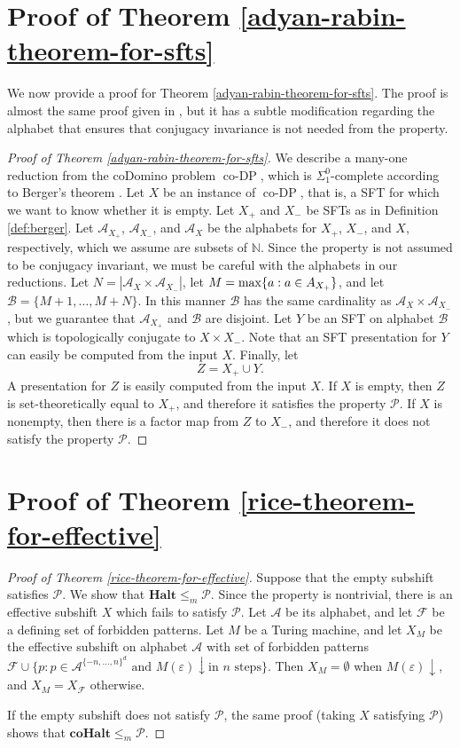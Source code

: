 \documentclass[a4paper]{article}
\newcommand{\coDP}{\operatorname{co-DP}}
\newcommand{\N}{\mathbb{N}}
\newcommand{\A}{\mathcal{A}}
\newcommand{\B}{\mathcal{B}}
\theoremstyle{definition}
\begin{document}
\newpage\appendix
\section{Proof of Theorem \ref{adyan-rabin-theorem-for-sfts}}\label{appendix-rice-theorems}
We now provide a proof for Theorem \ref{adyan-rabin-theorem-for-sfts}. The proof is almost the same proof given in \cite{carrasco-vargas_rice_2025}, but it has a subtle modification regarding the alphabet that ensures that  conjugacy invariance is not needed from the property.
\begin{proof}[Proof of Theorem \ref{adyan-rabin-theorem-for-sfts}]
    We describe a many-one reduction from the coDomino problem $\coDP$, which is $\Sigma_1^0$-complete according to Berger's theorem \cite{berger_undecidability_1966}. Let $X$ be an instance of $\coDP$, that is, a SFT for which we want to know whether it is empty. Let $X_{+}$ and $X_{-}$ be SFTs as in Definition \ref{def:berger}. Let $\A_{X_{+}}$, $\A_{X_{-}}$, and $\A_{X}$ be the alphabets for $X_{+}$, $X_{-}$, and $X$, respectively, which we assume are subsets of $\N$. Since the property is not assumed to be conjugacy invariant, we must be careful with the alphabets in our reductions. Let $N=|\A_{X}\times \A_{X_{-}}|$, let $M=\max\{a : a \in \mathcal \A_{X_{+}}\}$, and let $\B=\{M+1,\dots,M+N\}$. In this manner $\B$ has the same cardinality as $\A_{X}\times \A_{X_{-}}$, but we guarantee that $\A_{X_{+}}$ and $\B$ are disjoint. Let $Y$ be an SFT on alphabet $\B$ which is topologically conjugate to $X\times X_{-}$. Note that an SFT presentation for $Y$ can easily be computed from the input $X$. Finally, let 
    \[Z=X_{+}\cup Y.\]
    A presentation for $Z$ is easily computed from the input $X$. If $X$ is empty, then $Z$ is set-theoretically equal to $X_{+}$, and therefore it satisfies the property $\mathcal P$. If $X$ is nonempty, then there is a factor map from $Z$  to $X_{-}$, and therefore it does not satisfy the property $\mathcal P$. 
\end{proof}

\section{Proof of Theorem \ref{rice-theorem-for-effective}}
\label{appendix-rice-theorem-for-effective}
\begin{proof}[Proof of Theorem \ref{rice-theorem-for-effective}]
    Suppose that the empty subshift satisfies $\mathcal P$. We show that $\textbf{Halt}\leq_m \mathcal P$. Since the property is nontrivial, there is an effective subshift $X$ which fails to satisfy $\mathcal P$. Let $\A$ be its alphabet, and let $\mathcal F$ be a defining set of forbidden patterns. Let $M$ be a Turing machine, and let $X_M$ be the effective subshift on alphabet $\A$ with set of forbidden patterns $\mathcal F \cup \{p : p\in \A^{\{-n,\dots,n\}^d}\text{ and } M(\varepsilon)\downarrow\text{in $n$ steps}\}$. Then $X_M=\emptyset$ when $M(\varepsilon)\downarrow$, and $X_M=X_{\mathcal F}$ otherwise. 

    If the empty subshift does not satisfy $\mathcal P$, the same proof (taking $X$ satisfying $\mathcal{P}$) shows that $\textbf{coHalt}\leq_m \mathcal P$.
\end{proof}
\end{document}
